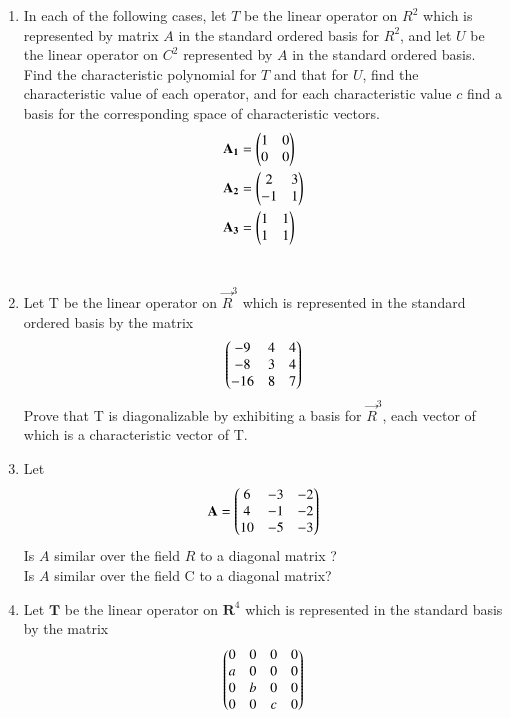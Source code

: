 \renewcommand{\theequation}{\theenumi}
\renewcommand{\thefigure}{\theenumi}
\begin{enumerate}[label=\thesubsection.\arabic*.,ref=\thesubsection.\theenumi]


\item In each of the following cases, let $T$ be the linear operator on $R^2$ which is represented by matrix $A$ in the standard ordered basis for $R^2$, and let $U$ be the linear operator on $C^2$ represented by $A$ in the standard ordered basis. Find the characteristic polynomial for $T$ and that for $U$, find the characteristic value of each operator, and for each characteristic value $c$ find a basis for the corresponding space of characteristic vectors.
\begin{align}
    \mathbf{A_1} &= \begin{pmatrix}1&0\\
                     0&0\end{pmatrix}\\
    \mathbf{A_2} &= \begin{pmatrix}2&3\\
                     -1&1\end{pmatrix}\\
    \mathbf{A_3} &= \begin{pmatrix}1&1\\
                     1&1\end{pmatrix}
\end{align}     
%
%
\\
\solution

\item Let T be the linear operator on $\vec{R}^3$ which is represented in the standard ordered basis by the matrix
\begin{align}
\begin{pmatrix}-9&4&4\\-8&3&4\\-16&8&7\end{pmatrix}
\label{eq:solutions/6/2/4/Q}
\end{align}
Prove that T is diagonalizable by exhibiting a basis for $\vec{R}^3$, each vector of which is a characteristic vector of T. 
%
%
\\
\solution

\item Let
\begin{align}
\mathbf{A}=\begin{pmatrix}6&-3&-2\\4&-1&-2\\10&-5&-3\end{pmatrix}
\end{align}
Is $A$ similar over the field $R$ to a diagonal matrix ? \\Is $A$ similar over the field C to a diagonal matrix?
%
%
\\
\solution

\twocolumn
\item 	Let $\mathbf{T}$ be the linear operator on $\mathbf{R}^{4}$ which is represented in the standard basis by the matrix \\
	\begin{align}
	    \begin{pmatrix}0&0&0&0 \\ a&0&0&0 \\ 0&b&0&0 \\ 0&0&c&0\end{pmatrix} 
	\end{align}
	

\end{enumerate}
